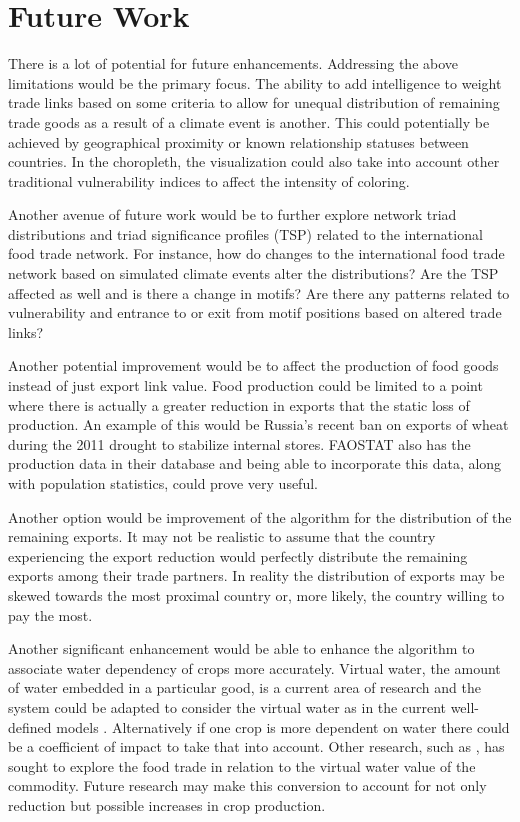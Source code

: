 \section{Future Work}
There is a lot of potential for future enhancements. Addressing the above limitations would be the primary focus. The ability to add intelligence to weight trade links based on some criteria to allow for unequal distribution of remaining trade goods as a result of a climate event is another. This could potentially be achieved by geographical proximity or known relationship statuses between countries. In the choropleth, the visualization could also take into account other traditional vulnerability indices to affect the intensity of coloring.\par
Another avenue of future work would be to further explore network triad distributions and triad significance profiles (TSP) related to the international food trade network. For instance, how do changes to the international food trade network based on simulated climate events alter the distributions? Are the TSP affected as well and is there a change in motifs? Are there any patterns related to vulnerability and entrance to or exit from motif positions based on altered trade links?\par
Another potential improvement would be to affect the production of food goods instead of just export link value. Food production could be limited to a point where there is actually a greater reduction in exports that the static loss of production. An example of this would be Russia's recent ban on exports of wheat during the 2011 drought to stabilize internal stores. FAOSTAT also has the production data in their database and being able to incorporate this data, along with population statistics, could prove very useful.\par
Another option would be improvement of the algorithm for the distribution of the remaining exports. It may not be realistic to assume that the country experiencing the export reduction would perfectly distribute the remaining exports among their trade partners. In reality the distribution of exports may be skewed towards the most proximal country or, more likely, the country willing to pay the most.\par
Another significant enhancement would be able to enhance the algorithm to associate water dependency of crops more accurately. Virtual water, the amount of water embedded in a particular good, is a current area of research and the system could be adapted to consider the virtual water as in the current well-defined models \citep{hoekstra2005globalisation}. Alternatively if one crop is more dependent on water there could be a coefficient of impact to take that into account. Other research, such as \cite{konar2011water}, has sought to explore the food trade in relation to the virtual water value of the commodity. Future research may make this conversion to account for not only reduction but possible increases in crop production.\par
